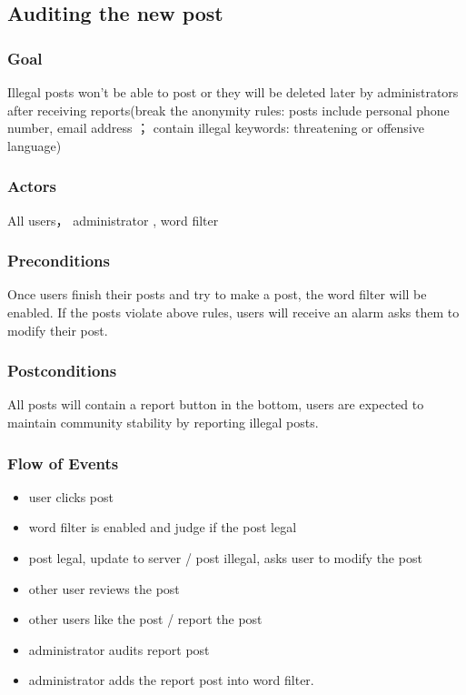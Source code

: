 \documentclass[12pt]{article}
\begin{document}
\subsection{Auditing the new post}

  \subsubsection{Goal}
  Illegal posts won’t be able to post or they will be deleted later by administrators after receiving reports(break the anonymity rules: posts include personal phone number, email address ； contain illegal keywords: threatening or offensive language)


  \subsubsection{Actors}
  All users， administrator , word filter


  \subsubsection{Preconditions}
  Once users finish their posts and try to make a post, the word filter will be enabled. If the posts violate above rules, users will receive an alarm asks them to modify their post.


  \subsubsection{Postconditions}
   All posts will contain a report button in the bottom,  users are expected to maintain community stability by reporting illegal posts.


  \subsubsection{Flow of Events}
  \begin{itemize}
    \item user clicks post
    \item word filter is enabled and judge if the post legal
    \item post legal, update to server / post illegal,  asks user to modify the post
    \item  other user reviews the post
    \item  other users like the post / report the post
    \item administrator audits report post
    \item administrator adds the report post into word filter.
  \end{itemize}
\end{document}
